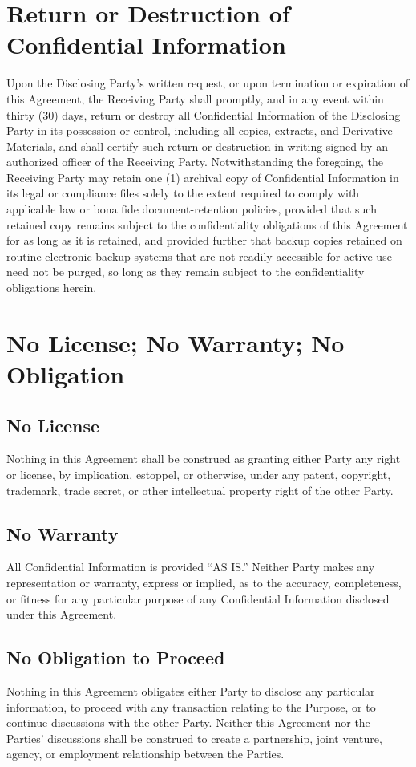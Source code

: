 \section{Return or Destruction of Confidential Information}

Upon the Disclosing Party's written request, or upon termination or expiration of this Agreement, the Receiving Party shall promptly, and in any event within thirty (30) days, return or destroy all Confidential Information of the Disclosing Party in its possession or control, including all copies, extracts, and Derivative Materials, and shall certify such return or destruction in writing signed by an authorized officer of the Receiving Party. Notwithstanding the foregoing, the Receiving Party may retain one (1) archival copy of Confidential Information in its legal or compliance files solely to the extent required to comply with applicable law or bona fide document-retention policies, provided that such retained copy remains subject to the confidentiality obligations of this Agreement for as long as it is retained, and provided further that backup copies retained on routine electronic backup systems that are not readily accessible for active use need not be purged, so long as they remain subject to the confidentiality obligations herein.

\section{No License; No Warranty; No Obligation}

\subsection{No License} Nothing in this Agreement shall be construed as granting either Party any right or license, by implication, estoppel, or otherwise, under any patent, copyright, trademark, trade secret, or other intellectual property right of the other Party.

\subsection{No Warranty} All Confidential Information is provided ``AS IS.'' Neither Party makes any representation or warranty, express or implied, as to the accuracy, completeness, or fitness for any particular purpose of any Confidential Information disclosed under this Agreement.

\subsection{No Obligation to Proceed} Nothing in this Agreement obligates either Party to disclose any particular information, to proceed with any transaction relating to the Purpose, or to continue discussions with the other Party. Neither this Agreement nor the Parties' discussions shall be construed to create a partnership, joint venture, agency, or employment relationship between the Parties.


